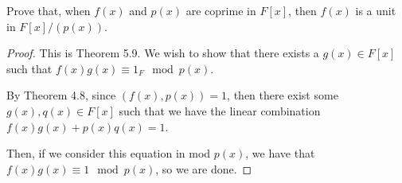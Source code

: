 \documentclass[../hw6]{subfiles}
\begin{document}
\begin{problem}
Prove that, when $f(x)$ and $p(x)$ are coprime in $F[x]$, then $f(x)$ is a unit in $F[x]/(p(x))$.
\end{problem}
\begin{proof}
	This is Theorem 5.9.
	We wish to show that there exists a $g(x)\in F[x]$ such that $f(x)g(x)\equiv 1_F \mod{p(x)} $.

	By Theorem 4.8, since $(f(x),p(x))=1$, then there exist some $g(x),q(x)\in F[x]$ such that we have the linear combination $f(x)g(x)+p(x)q(x)=1$.

	Then, if we consider this equation in mod  $p(x)$, we have that  $f(x)g(x)\equiv 1 \mod{p(x)}$, so we are done.
\end{proof}
\end{document}
